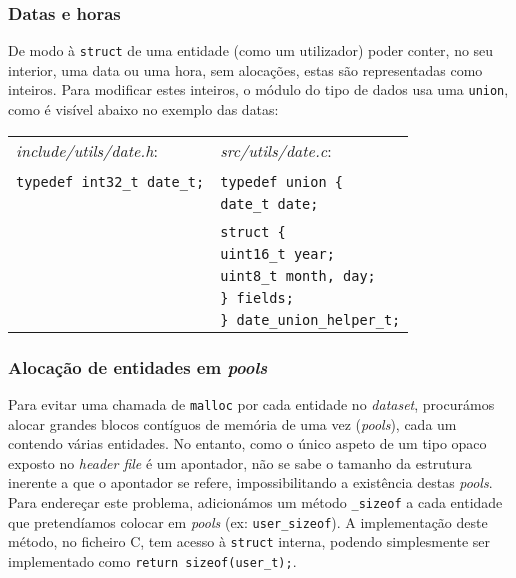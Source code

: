 \documentclass[12pt, a4paper]{article}
\begin{document}
\subsubsection{Datas e horas}

De modo à \texttt{struct} de uma entidade (como um utilizador) poder conter, no seu interior, uma
data ou uma hora, sem alocações, estas são representadas como inteiros. Para modificar estes
inteiros, o módulo do tipo de dados usa uma \texttt{union}, como é visível abaixo no exemplo das
datas:


\begin{spacing}{1}
\begin{center}
    \begin{tabular}{ |l|l| }
        \hline
        \emph{include/utils/date.h}: & \emph{src/utils/date.c}: \\
		& \\
		\texttt{typedef int32\_t date\_t;} & \texttt{typedef union \{} \\
										   & \texttt{\hspace{0.5cm}date\_t date;} \\
                                           & \texttt{} \\
                                           & \texttt{\hspace{0.5cm}struct \{} \\
                                           & \texttt{\hspace{1cm}uint16\_t year;} \\
                                           & \texttt{\hspace{1cm}uint8\_t month, day;} \\
                                           & \texttt{\hspace{0.5cm}\} fields;} \\
                                           & \texttt{\} date\_union\_helper\_t;} \\
        \hline
    \end{tabular}
\end{center}
\end{spacing}

\subsubsection{Alocação de entidades em \emph{pools}}

Para evitar uma chamada de \texttt{malloc} por cada entidade no \emph{dataset}, procurámos alocar
grandes blocos contíguos de memória de uma vez (\emph{pools}), cada um contendo várias entidades.
No entanto, como o único aspeto de um tipo opaco exposto no \emph{header file} é um apontador, não
se sabe o tamanho da estrutura inerente a que o apontador se refere, impossibilitando a existência
destas \emph{pools}. Para endereçar este problema, adicionámos um método \texttt{\_sizeof} a cada
entidade que pretendíamos colocar em \emph{pools} (ex: \texttt{user\_sizeof}). A implementação
deste método, no ficheiro C, tem acesso à \texttt{struct} interna, podendo simplesmente ser
implementado como \texttt{return sizeof(user\_t);}.
\end{document}
